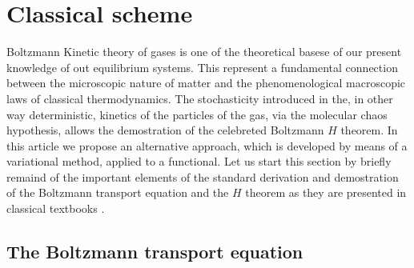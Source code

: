 

\section{Classical scheme}\label{sec:classical}

Boltzmann Kinetic theory of gases is one of the theoretical basese of our present 
knowledge of out equilibrium systems. This represent a fundamental connection
between the microscopic nature of matter and the phenomenological macroscopic  laws of classical thermodynamics.
The stochasticity introduced in the, in other way deterministic, kinetics of the
particles of the gas, via the molecular chaos hypothesis, allows the demostration 
of the celebreted Boltzmann $H$ theorem. In this article we propose an alternative approach, which is 
developed by means of a variational method, applied to a functional.
Let us start this section by briefly remaind of the important elements of the 
standard derivation and demostration of the Boltzmann transport equation and the $H$ theorem as they are presented in classical textbooks \cite{bib:huang}. 

\subsection{The Boltzmann transport equation}

